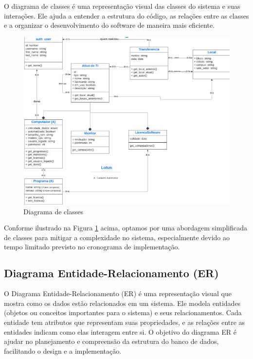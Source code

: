 O diagrama de classes é uma representação visual das classes do sistema e suas interações. Ele ajuda a entender a estrutura do código, as relações entre as classes e a organizar o desenvolvimento do software de maneira mais eficiente.

\begin{figure}[H]
    \centering
    \includegraphics[width=0.8\linewidth]{figuras/diagramaclasses.png}
    \caption{Diagrama de classes}
    \label{fig:classes}
\end{figure}

Conforme ilustrado na Figura \ref{fig:classes} acima, optamos por uma abordagem simplificada de classes para mitigar a complexidade no sistema, especialmente devido ao tempo limitado previsto no cronograma de implementação.

\subsection{Diagrama Entidade-Relacionamento (ER)}
O Diagrama Entidade-Relacionamento (ER) é uma representação visual que mostra como os dados estão relacionados em um sistema. Ele modela entidades (objetos ou conceitos importantes para o sistema) e seus relacionamentos. Cada entidade tem atributos que representam suas propriedades, e as relações entre as entidades indicam como elas interagem entre si. O objetivo do diagrama ER é ajudar no planejamento e compreensão da estrutura do banco de dados, facilitando o design e a implementação.

